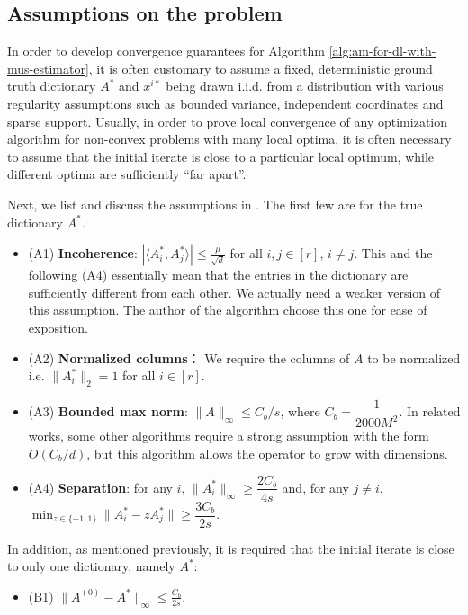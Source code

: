 \subsection{Assumptions on the problem} 

In order to develop convergence guarantees for Algorithm \ref{alg:am-for-dl-with-mus-estimator}, it is often customary to assume a fixed, deterministic ground truth dictionary $A^*$ and $x^{i*}$ being drawn i.i.d. from a distribution with various regularity assumptions such as bounded variance, independent coordinates and sparse support. Usually, in order to prove local convergence of any optimization algorithm for non-convex problems with many local optima, it is often necessary to assume that the initial iterate is close to a particular local optimum, while different optima are sufficiently ``far apart''.

Next, we list and discuss the assumptions in \cite{chatterji2017alternating}. The first few are for the true dictionary $A^*$. 
\begin{itemize}
    \item (A1) \textbf{Incoherence}: $\left| \langle A_i^*, A_j^*\rangle \right| \leq \frac{\mu}{\sqrt{d}} $ for all $i,j\in [r]$, $i\neq j$.  This and the following (A4) essentially mean that the entries in the dictionary are sufficiently different from each other. We actually need a weaker version of this assumption. The author of the algorithm choose this one for ease of exposition.
    \item (A2) \textbf{Normalized columns}： We require the columns of $A$ to be normalized i.e. $\|A_i^*\|_2=1$ for all $i\in [r]$. 
    \item (A3) \textbf{Bounded max norm}: $\|A\|_\infty \leq C_b/s$, where $C_b = \dfrac{1}{2000 M^2}$. In related works, some other algorithms require a strong assumption with the form $O(C_b/d)$, but this algorithm allows the operator to grow with dimensions.
    \item (A4) \textbf{Separation}: for any $i$, $\|A_i^*\|_\infty \geq \dfrac{2C_b}{4s}$ 
    and, for any $j\neq i$, $\min_{z\in \{-1, 1\}} \|A_i^* - z A^*_j\|\geq \dfrac{3C_b}{2s}$.
\end{itemize}

In addition, as mentioned previously, it is required that the initial iterate is close to only one dictionary, namely $A^*$:
\begin{itemize}
    \item (B1) $\|A^{(0)} - A^*\|_\infty \leq \frac{C_b}{2s}$. 
\end{itemize}

